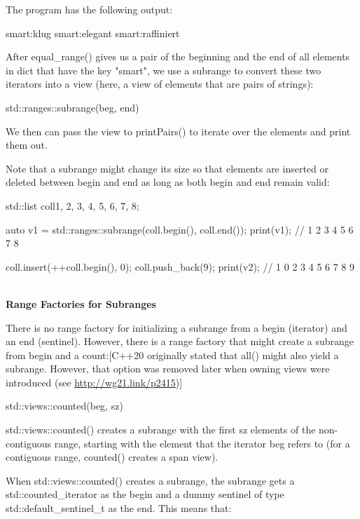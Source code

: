 The program has the following output:

{\footnotesize
\begin{shell}
smart:klug smart:elegant smart:raffiniert
\end{shell}
}

After equal\_range() gives us a pair of the beginning and the end of all elements in dict that have the key "smart", we use a subrange to convert these two iterators into a view (here, a view of elements that are pairs of strings):

\begin{cpp}
std::ranges::subrange(beg, end)
\end{cpp}

We then can pass the view to printPairs() to iterate over the elements and print them out.

Note that a subrange might change its size so that elements are inserted or deleted between begin and end as long as both begin and end remain valid:

\begin{cpp}
std::list coll{1, 2, 3, 4, 5, 6, 7, 8};

auto v1 = std::ranges::subrange(coll.begin(), coll.end());
print(v1); // 1 2 3 4 5 6 7 8

coll.insert(++coll.begin(), 0);
coll.push_back(9);
print(v2); // 1 0 2 3 4 5 6 7 8 9
\end{cpp}

\noindent
\hspace*{\fill} \\ %
\textbf{Range Factories for Subranges}

There is no range factory for initializing a subrange from a begin (iterator) and an end (sentinel). However, there is a range factory that might create a subrange from begin and a count:[C++20 originally stated that all() might also yield a subrange. However, that option was removed later when owning views were introduced (see \url{http://wg21.link/p2415})]

\begin{cpp}
std::views::counted(beg, sz)
\end{cpp}

std::views::counted() creates a subrange with the first sz elements of the non-contiguous range, starting with the element that the iterator beg refers to (for a contiguous range, counted() creates a span view).

When std::views::counted() creates a subrange, the subrange gets a std::counted\_iterator as the begin and a dummy sentinel of type std::default\_sentinel\_t as the end. This means that:

